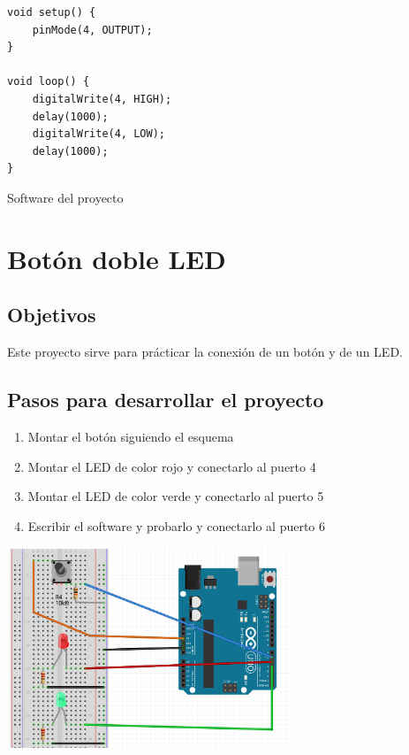 \documentclass[11pt,spanish,a4paper]{article}
\begin{document}
\begin{listing}[H]
\begin{verbatim}
void setup() {
    pinMode(4, OUTPUT);
}

void loop() {
    digitalWrite(4, HIGH);
    delay(1000);
    digitalWrite(4, LOW);
    delay(1000);
}
\end{verbatim}
\caption{Software del proyecto \thesection}
\end{listing}


\newpage
\section{Botón doble LED}

\subsection{Objetivos}

Este proyecto sirve para prácticar la conexión de un botón y de un LED.

\subsection{Pasos para desarrollar el proyecto}
\begin{enumerate}
	\item Montar el botón siguiendo el esquema
	\item Montar el LED de color rojo y conectarlo al puerto 4
	\item Montar el LED de color verde y conectarlo al puerto 5
	\item Escribir el software y probarlo y conectarlo al puerto 6
\end{enumerate}

\begin{center}
\includegraphics[height=6cm]{img/02.jpg}
\end{center}
\end{document}
